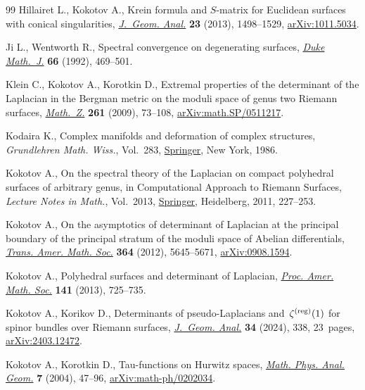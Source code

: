 \documentclass[pdftex]{sigma}
\numberwithin{equation}{section}
\theoremstyle{definition}
\begin{document}
\begin{thebibliography}{99}
Hillairet L., Kokotov A., Krein formula and {$S$}-matrix for {E}uclidean
 surfaces with conical singularities,
 \href{https://doi.org/10.1007/s12220-012-9295-3}{\textit{J.~Geom. Anal.}}
 \textbf{23} (2013), 1498--1529,
 \href{http://arxiv.org/abs/1011.5034}{arXiv:1011.5034}.

Ji L., Wentworth R., Spectral convergence on degenerating surfaces,
 \href{https://doi.org/10.1215/S0012-7094-92-06615-4}{\textit{Duke Math.~J.}}
 \textbf{66} (1992), 469--501.

Klein C., Kokotov A., Korotkin D., Extremal properties of the determinant of
 the {L}aplacian in the {B}ergman metric on the moduli space of genus two
 {R}iemann surfaces,
 \href{https://doi.org/10.1007/s00209-008-0314-9}{\textit{Math.~Z.}}
 \textbf{261} (2009), 73--108,
 \href{http://arxiv.org/abs/math.SP/0511217}{arXiv:math.SP/0511217}.

Kodaira K., Complex manifolds and deformation of complex structures,
 \textit{Grundlehren Math. Wiss.}, Vol.~283,
 \href{https://doi.org/10.1007/978-1-4613-8590-5}{Springer}, New York, 1986.

Kokotov A., On the spectral theory of the {L}aplacian on compact polyhedral
 surfaces of arbitrary genus, in Computational {A}pproach to {R}iemann
 {S}urfaces, \textit{Lecture Notes in Math.}, Vol.~2013,
 \href{https://doi.org/10.1007/978-3-642-17413-1_8}{Springer}, Heidelberg,
 2011, 227--253.

Kokotov A., On the asymptotics of determinant of {L}aplacian at the principal
 boundary of the principal stratum of the moduli space of {A}belian
 differentials,
 \href{https://doi.org/10.1090/S0002-9947-2012-05695-9}{\textit{Trans. Amer.
 Math. Soc.}} \textbf{364} (2012), 5645--5671,
 \href{http://arxiv.org/abs/0908.1594}{arXiv:0908.1594}.

Kokotov A., Polyhedral surfaces and determinant of {L}aplacian,
 \href{https://doi.org/10.1090/S0002-9939-2012-11531-X}{\textit{Proc. Amer.
 Math. Soc.}} \textbf{141} (2013), 725--735.

Kokotov A., Korikov D., Determinants of pseudo-{L}aplacians
 and~{$\zeta^{(\rm{reg})}(1)$} for spinor bundles over {R}iemann surfaces,
 \href{https://doi.org/10.1007/s12220-024-01782-8}{\textit{J.~Geom. Anal.}}
 \textbf{34} (2024), 338, 23~pages,
 \href{http://arxiv.org/abs/2403.12472}{arXiv:2403.12472}.

Kokotov A., Korotkin D., Tau-functions on {H}urwitz spaces,
 \href{https://doi.org/10.1023/B:MPAG.0000022835.68838.56}{\textit{Math. Phys.
 Anal. Geom.}} \textbf{7} (2004), 47--96,
 \href{http://arxiv.org/abs/math-ph/0202034}{arXiv:math-ph/0202034}.


\end{thebibliography}
\end{document}
